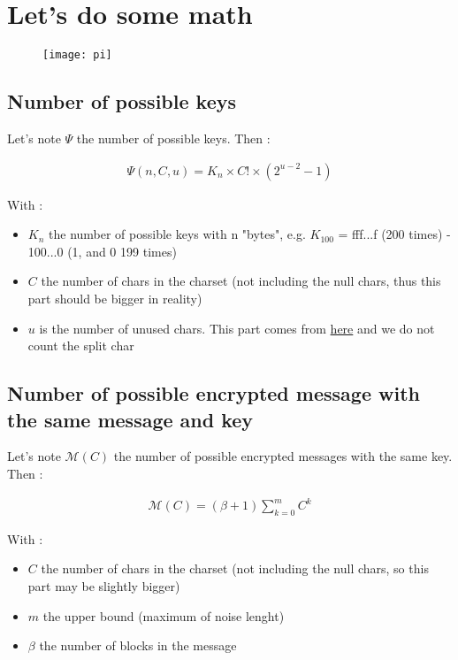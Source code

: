 \section{Let's do some math}

\begin{figure}[H]
    \centering
    \texttt{[image: pi]}
\end{figure}


\subsection{Number of possible keys}
    
Let's note $\Psi$ the number of possible keys. Then :
\begin{large}
\begin{align}
    \Psi(n,C,u) = K_n \times C! \times (2^{u-2}-1)
\end{align}
\end{large}
With :
\begin{itemize}
    \item $K_{n}$ the number of possible keys with n "bytes", e.g. $K_{100}$ = fff...f (200 times) - 100...0 (1, and 0 199 times)
    \item $C$ the number of chars in the charset (not including the null chars, thus this part should be bigger in reality)
    \item $u$ is the number of unused chars. This part comes from 
                \href{https://math.stackexchange.com/questions/3340723/how-many-ways-to-partition-n-elements-into-two-nonempty-subsets}{here} 
          and we do not count the split char
    
\end{itemize}

\subsection{Number of possible encrypted message with the same message and key}

Let's note $\mathcal{M}(C)$ the number of possible encrypted messages with the same key. Then :
\begin{large}
\begin{align}
    \mathcal{M}(C) = (\beta + 1) \sum_{k=0}^{m}{C^k} 
\end{align}
\end{large}
With :
\begin{itemize}
    \item $C$ the number of chars in the charset (not including the null chars, so this part may be slightly bigger)
    \item $m$ the upper bound (maximum of noise lenght)
    \item $\beta$ the number of blocks in the message
\end{itemize}

